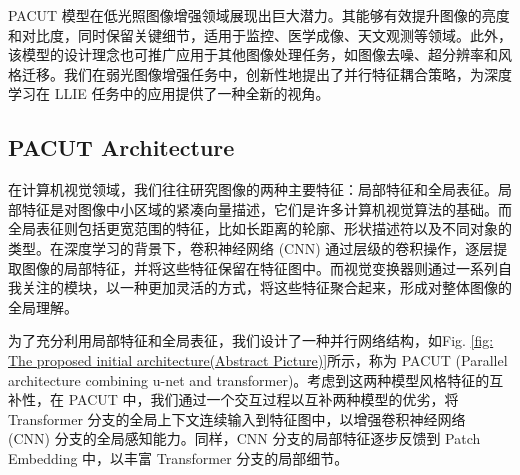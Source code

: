 \documentclass[a4paper]{ctexart}
\begin{document}
	
	PACUT 模型在低光照图像增强领域展现出巨大潜力。其能够有效提升图像的亮度和对比度，同时保留关键细节，适用于监控、医学成像、天文观测等领域。此外，该模型的设计理念也可推广应用于其他图像处理任务，如图像去噪、超分辨率和风格迁移。我们在弱光图像增强任务中，创新性地提出了并行特征耦合策略，为深度学习在 LLIE 任务中的应用提供了一种全新的视角。
	
	\subsection{PACUT Architecture}
	
	在计算机视觉领域，我们往往研究图像的两种主要特征：局部特征和全局表征。局部特征\cite{jain1991unsupervised}\cite{lowe2004distinctive}\cite{ojala2002multiresolution}是对图像中小区域的紧凑向量描述，它们是许多计算机视觉算法的基础。而全局表征则包括更宽范围的特征，比如长距离的轮廓\cite{lisin2005combining}、形状描述符以及不同对象的类型。在深度学习的背景下，卷积神经网络 (CNN) 通过层级的卷积操作，逐层提取图像的局部特征，并将这些特征保留在特征图中。而视觉变换器则通过一系列自我关注的模块，以一种更加灵活的方式，将这些特征聚合起来，形成对整体图像的全局理解。
	
	为了充分利用局部特征和全局表征，我们设计了一种并行网络结构，如Fig. \ref{fig: The proposed initial architecture(Abstract Picture)}所示，称为 PACUT (Parallel architecture combining u-net and transformer)。考虑到这两种模型风格特征的互补性，在 PACUT 中，我们通过一个交互过程以互补两种模型的优劣，将 Transformer 分支的全局上下文连续输入到特征图中，以增强卷积神经网络 (CNN) 分支的全局感知能力。同样，CNN 分支的局部特征逐步反馈到 Patch Embedding 中，以丰富 Transformer 分支的局部细节。
	
\end{document}
